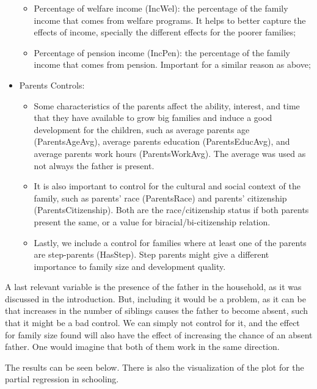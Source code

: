 \documentclass[12pt]{article}
\begin{document}
\begin{itemize}
\begin{itemize}
        \item Percentage of welfare income (IncWel): the percentage of the family income that comes from welfare programs. It helps to better capture the effects of income, specially the different effects for the poorer families;
        \item Percentage of pension income (IncPen): the percentage of the family income that comes from pension. Important for a similar reason as above;
    \end{itemize}
    \item Parents Controls:
    \begin{itemize}
        \item Some characteristics of the parents affect the ability, interest, and time that they have available to grow big families and induce a good development for the children, such as average parents age (ParentsAgeAvg), average parents education (ParentsEducAvg), and average parents work hours (ParentsWorkAvg). The average was used as not always the father is present.
        \item It is also important to control for the cultural and social context of the family, such as parents' race (ParentsRace) and parents' citizenship (ParentsCitizenship). Both are the race/citizenship status if both parents present the same, or a value for biracial/bi-citizenship relation.
        \item Lastly, we include a control for families where at least one of the parents are step-parents (HasStep). Step parents might give a different importance to family size and development quality.
    \end{itemize}
\end{itemize}

A last relevant variable is the presence of the father in the household, as it was discussed in the introduction. But, including it would be a problem, as it can be that increases in the number of siblings causes the father to become absent, such that it might be a bad control. We can simply not control for it, and the effect for family size found will also have the effect of increasing the chance of an absent father. One would imagine that both of them work in the same direction.

The results can be seen below. There is also the visualization of the plot for the partial regression in schooling.


\end{document}
